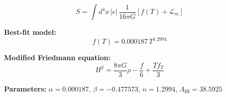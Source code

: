 
\begin{equation}
  S = \int d^4x \, |e| \, \frac{1}{16\pi G} \left[ f(T) + \mathcal{L}_m \right]
\end{equation}

\textbf{Best-fit model:}
\begin{equation}
  f(T) = 0.000187 \, T^{1.2994}
\end{equation}

\textbf{Modified Friedmann equation:}
\begin{equation}
  H^2 = \frac{8\pi G}{3} \rho - \frac{f}{6} + \frac{T f_T}{3}
\end{equation}

\textbf{Parameters:}
$\alpha = 0.000187$, \quad
$\beta = -0.477573$, \quad
$n = 1.2994$, \quad
$\Lambda_{\text{BI}} = 38.5925$
